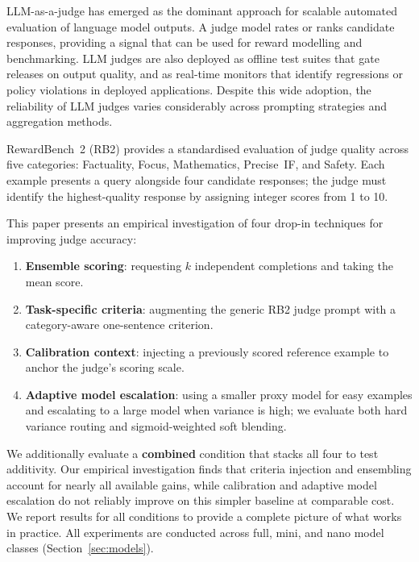 \documentclass{article}
\begin{document}
LLM-as-a-judge has emerged as the dominant approach for scalable automated evaluation of language model outputs. A judge model rates or ranks candidate responses, providing a signal that can be used for reward modelling and benchmarking. LLM judges are also deployed as offline test suites that gate releases on output quality, and as real-time monitors that identify regressions or policy violations in deployed applications. Despite this wide adoption, the reliability of LLM judges varies considerably across prompting strategies and aggregation methods.

RewardBench~2 (RB2) \citep{malik2025rewardbench2} provides a standardised evaluation of judge quality across five categories: Factuality, Focus, Mathematics, Precise~IF, and Safety. Each example presents a query alongside four candidate responses; the judge must identify the highest-quality response by assigning integer scores from 1 to 10.

This paper presents an empirical investigation of four drop-in techniques for improving judge accuracy:

\begin{enumerate}
  \item \textbf{Ensemble scoring}: requesting $k$ independent completions and taking the mean score.
  \item \textbf{Task-specific criteria}: augmenting the generic RB2 judge prompt with a category-aware one-sentence criterion.
  \item \textbf{Calibration context}: injecting a previously scored reference example to anchor the judge's scoring scale.
  \item \textbf{Adaptive model escalation}: using a smaller proxy model for easy examples and escalating to a large model when variance is high; we evaluate both hard variance routing and sigmoid-weighted soft blending.
\end{enumerate}

We additionally evaluate a \textbf{combined} condition that stacks all four to test additivity. Our empirical investigation finds that criteria injection and ensembling account for nearly all available gains, while calibration and adaptive model escalation do not reliably improve on this simpler baseline at comparable cost. We report results for all conditions to provide a complete picture of what works in practice. All experiments are conducted across full, mini, and nano model classes (Section~\ref{sec:models}).
\end{document}
